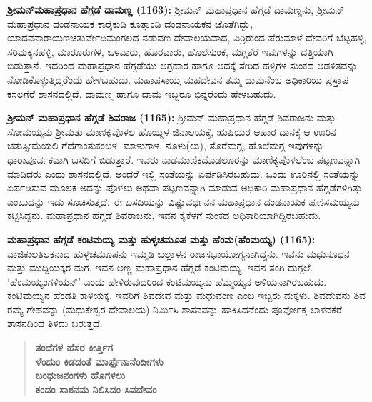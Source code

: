 \textbf{ಶ‍್ರೀಮನ್​ಮಹಾಪ್ರಧಾನ ಹೆಗ್ಗಡೆ ದಾಮಣ್ಣ (1163):} ಶ‍್ರೀಮನ್​ ಮಹಾಪ್ರಧಾನ ಹೆಗ್ಗಡೆ ದಾಮಣ್ಣನು, ಶ‍್ರೀಮನ್​ ಮಹಾಪ್ರಧಾನ ದಂಡನಾಯಕ ಕಾರೈಕುಡಿ ಕೂತ್ತಾಂಡಿ ದಂಡನಾಯಕನ ಜೊತೆಗಿದ್ದು, ಯಾದವನಾರಾಯಣ\break ಚತುರ್ವೇದಿಮಂಗಲದ ನಡುವಣ ದೇವಾಲಯವಾದ, ವಿರ್ರಿರುಂದ ಪೆರುಮಾಳೆ ದೇವರಿಗೆ ಬೆಟ್ಟಹಳ್ಳಿ, ಸರಿಮಕ್ಕನಹಳ್ಳಿ, ಮಾರೂರುಗಳ, ಒಳವಾರು, ಹೊರವಾರು, ಹೊಲೆಸುಂಕ, ಮಗ್ಗತೆರೆ ಇವುಗಳನ್ನು ದತ್ತಿಯಾಗಿ ಬಿಡುತ್ತಾನೆ. ಇದರಿಂದ ಮಹಾಪ್ರಧಾನ ಹೆಗ್ಗಡೆಯು ಅಗ್ರಹಾರ ಹಾಗೂ ಅದಕ್ಕೆ ಸೇರಿದ ಹಳ್ಳಿಗಳ ಸುಂಕದ ಆಡಳಿತವನ್ನು ನೋಡಿಕೊಳ್ಳುತ್ತಿದ್ದರೆಂದು ಹೇಳಬಹುದು. ಮಹಾಪಸಾಯ್ತ ಮಹದೇವನ ತಮ್ಮ ದಾಮನೆಂಬ ಅಧಿಕಾರಿಯ ಪ್ರಸ್ತಾಪ ಕಸಲಗೆರೆ ಶಾಸನದಲ್ಲಿದೆ. ದಾಮಣ್ಣ ಹಾಗೂ ದಾಮ ಇಬ್ಬರೂ ಭಿನ್ನರೆಂದು ಹೇಳಬಹುದು.

\textbf{ಶ‍್ರೀಮನ್​ ಮಹಾಪ್ರಧಾನ ಹೆಗ್ಗಡೆ ಶಿವರಾಜ (1165):} ಶ‍್ರೀಮನ್​ ಮಹಾಪ್ರಧಾನ ಹೆಗ್ಗಡೆ ಶಿವರಾಜನು ಮತ್ತು ಸೋಮಯ್ಯನು ಶ‍್ರೀಮತು ಮಾಣಿಕ್ಯವೊಳಲ ಹೊಯ್ಸಳ ಜಿನಾಲಯಕ್ಕೆ, ಋಷಿಯರ ಆಹಾರ ದಾನಕ್ಕೆ ಆ ಊರಿನ ಚತುಸ್ಸೀಮೆಯಲಿ ಗೆದೆಗಾಂತುಕಂಬಳ, ಮಾಳುಗಾಳ, ನೂಳು(ಲು), ತೊರೆಮಗ್ಗ, ಹೊಲೆಮಗ್ಗ ಇವುಗಳನ್ನು ಧಾರಾಪೂರ್ವಕವಾಗಿ ಬಸದಿಗೆ ಬಿಡುತ್ತಾರೆ. ಇವರು ನಾಡಮಾಣಿಕದೊಡಲೂರನ್ನು ಮಾಣಿಕ್ಯಪೊಳಲೆಂಬ ಪಟ್ಟಣವನ್ನಾಗಿ ಮಾಡಿದರು ಎಂದು ಶಾಸನದಲ್ಲಿದೆ. ಅಂದರೆ ಇಲ್ಲಿ ಸಂತೆಯನ್ನು ಏರ್ಪಡಿಸಿರಬಹುದು. ಒಂದು ಊರಿನಲ್ಲಿ ಸಂತೆಯನ್ನು ಏರ್ಪಡಿಸುವ ಮೂಲಕ ಅದನ್ನು ಪೊಳಲು ಅಥವಾ ಪಟ್ಟಣವನ್ನಾಗಿ ಮಾಡುವ ಅಧಿಕಾರಿ ಮಹಾಪ್ರಧಾನ ಹೆಗ್ಗಡೆಗಳಿಗಿತ್ತು ಎಂಬುದನ್ನು ಇದು ಸೂಚಿಸುತ್ತದೆ. ಈ ಬಸದಿಯನ್ನು ವಿಷ್ಣುವರ್ಧನನ ಮಹಾಪ್ರಧಾನ ದಂಡನಾಯಕ ಪುಣಿಸಮಯ್ಯನು ಕಟ್ಟಿಸಿದ್ದನು. ಮಹಾಪ್ರಧಾನ ಹೆಗ್ಗಡೆ ಶಿವರಾಜನು, ಇವನ ಕೈಕೆಳಗೆ ಸುಂಕದ ಅಧಿಕಾರಿಯಾಗಿದ್ದಿರಬಹುದು.

\textbf{ಮಹಾಪ್ರಧಾನ ಹೆಗ್ಗಡೆ ಕಂಟಿಮಯ್ಯ ಮತ್ತು ಹುಳ್ಳಚಮೂಪ ಮತ್ತು ಹೆಂಮ(ಹೆಂಮಯ್ಯ) (1165):} ವಾಜಿಕುಲ\-ತಿಲಕನಾದ ಹುಳ್ಳಚಮೂಪನು ಇಮ್ಮಡಿ ಬಲ್ಲಾಳನ ರಾಜಸಭಾಯೋಗ್ಯನಾಗಿದ್ದನು. ಇವನು ಮಧುಸೂಧನ ಮತ್ತು ಮುದ್ದಿಯಕ್ಕರ ಮಗ. ಇವನ ಅಣ್ಣ ಮಹಾಪ್ರಧಾನ ಹೆಗ್ಗಡೆ ಕಂಟಿಮಯ್ಯ. ಇವನ ತಂಗಿ ದುಗ್ಗಲೆ. ‘ಹೆಂಮಯ್ಯಂಗಳಿಯನ್​’ ಎಂದು ಹೇಳಿರುವುದರಿಂದ ಕಂಟಿಮಯ್ಯನು ಹೆಮ್ಮಯ್ಯನ ಅಳಿಯನಾಗಿರಬಹುದು. ಕಂಟಿಮಯ್ಯನ ಹೆಂಡತಿ ಕಾಳಿಯಕ್ಕ. ಇವರಿಗೆ ಶಿವದೇವ ಮತ್ತು ಮಧುವಂಣ ಎಂಬ ಇಬ್ಬರು ಮಕ್ಕಳು. ಶಿವದೇವನು ಶಿವ ರಮ್ಯ ಗೇಹವನ್ನು (ಮಧುಕೇಶ್ವರ ದೇವಾಲಯ) ನಿರ್ಮಿಸಿ ಶಾಸನವನ್ನು ಹಾಕಿಸಿದನೆಂದು ಪೂರ್ವೋಕ್ತ ಲಾಳನಕೆರೆ ಶಾಸನದಿಂದ ತಿಳಿದು ಬರುತ್ತದೆ.

\begin{verse}
\textbf{ತಂದೆಗಳ ಹೆಸರ ಕೀರ್ತ್ತಿಗ} \\\textbf{ಳೆಂದುಂ ಕಿಡದಂತೆ ಮಾರ್ಪ್ಪೆನಾನೆಂದೀಗಳು} \\\textbf{ಬಂಧುಜನಂಗಳು ಹೊಗಳಲು} \\\textbf{ ಕಂದಂ ಸಾಶನಮ ನಿಲಿಸಿದಂ ಸಿವದೇವಂ}
\end{verse}

